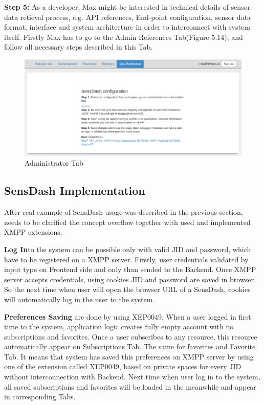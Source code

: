 \textbf{Step 5:} As a developer, Max might be interested in technical details of sensor data retieval process, e.g. API references, End-point configuration, sensor data format, interface and system architecture in order to interconnect with system itself. Firstly Max has to go to the Admin References Tab(Figure 5.14), and follow all necessary steps described in this Tab.
\begin{figure}[!ht]
\centering
\includegraphics[scale=0.6]{Screenshots/UseCaseScreenshot6.png}   
\caption[Administrator Tab]{Administrator Tab}                         
\end{figure}

\subsection{SensDash Implementation}
After real example of SensDash usage was described in the previous section, needs to be clarified the concept overflow together with used and implemented XMPP extensions.

\textbf{Log In}to the system can be possible only with valid JID and password, which have to be registered on a XMPP server. Firstly, user credentials validated by input type on Frontend side and only than sended to the Backend. Once XMPP server accepts credentials, using cookies JID and password are saved in browser. So the next time when user will open the browser URL of a SensDash, cookies will automatically log in the user to the system. 

\textbf{Preferences Saving} are done by using XEP0049. When a user logged in first time to the system, application logic creates fully empty account with no subscriptions and favorites. Once a user subscribes to any resource, this resource automatically appear on Subscriptions Tab. The same for favorites and Favorite Tab. It means that system has saved this preferences on XMPP server by using one of the extension called XEP0049, based on private spaces for every JID without interconnection with Backend. Next time when user log in to the system, all saved subscriptions and favorites will be loaded in the meanwhile and appear in corresponding Tabs.

